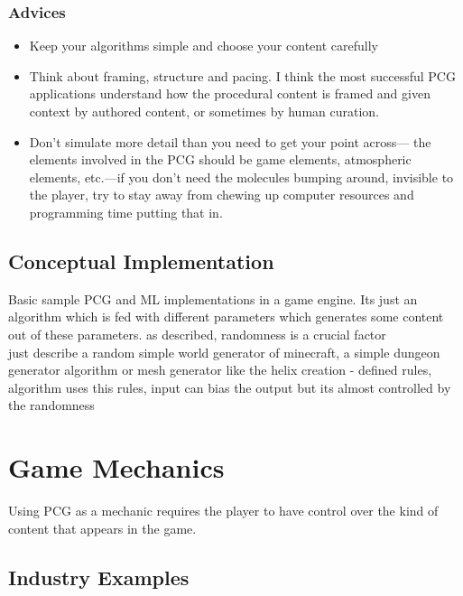 \documentclass[MGS,Master,english]{twbook}%
\begin{document}
\subsubsection{Advices}
\cite{pcg::book} 
\begin{itemize}
	\item Keep your algorithms simple and choose your content carefully 
	\item Think about framing, structure and pacing. I think the most successful PCG applications understand how the procedural content	is framed and given context by authored content, or sometimes by human curation.
	\item Don’t simulate more detail than you need to get your point across— the elements involved in the PCG should be game elements, atmospheric elements, etc.—if you don’t need the molecules bumping around, invisible to the	player, try to stay away from chewing up computer resources and programming time putting that in.
\end{itemize}

\subsection{Conceptual Implementation}
Basic sample PCG and ML implementations in a game engine.
Its just an algorithm which is fed with different parameters which generates some content out of these parameters. as described, randomness is a crucial factor\\
just describe a random simple world generator of minecraft, a simple dungeon generator algorithm or mesh generator like the helix creation - defined rules, algorithm uses this rules, input can bias the output but its almost controlled by the randomness



\section{Game Mechanics}
Using PCG as a mechanic requires the player to have control over the kind of content that appears in the game.\cite{pcg::endlessWeb}
\subsection{Industry Examples}
\end{document}
